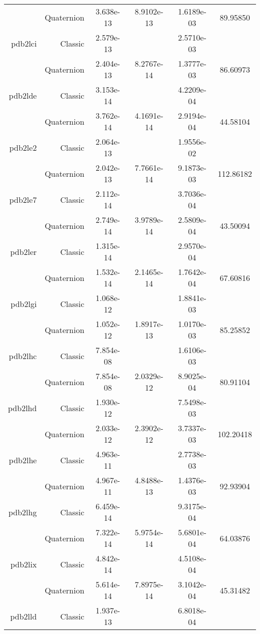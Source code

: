 \begin{xltabular}{\textwidth}{r|rS[table-format=1.3e+2]S[table-format=1.4e+2]S[table-format=1.4e+2]S[table-format=-1.5]}
& Quaternion & 3.638e-13 & 8.9102e-13 & 1.6189e-03 & 89.95850\\  \addlinespace
pdb2lci & Classic & 2.579e-13 &  & 2.5710e-03 & \\
& Quaternion & 2.404e-13 & 8.2767e-14 & 1.3777e-03 & 86.60973\\  \addlinespace
pdb2lde & Classic & 3.153e-14 &  & 4.2209e-04 & \\
& Quaternion & 3.762e-14 & 4.1691e-14 & 2.9194e-04 & 44.58104\\  \addlinespace
pdb2le2 & Classic & 2.064e-13 &  & 1.9556e-02 & \\
& Quaternion & 2.042e-13 & 7.7661e-14 & 9.1873e-03 & 112.86182\\  \addlinespace
pdb2le7 & Classic & 2.112e-14 &  & 3.7036e-04 & \\
& Quaternion & 2.749e-14 & 3.9789e-14 & 2.5809e-04 & 43.50094\\  \addlinespace
pdb2ler & Classic & 1.315e-14 &  & 2.9570e-04 & \\
& Quaternion & 1.532e-14 & 2.1465e-14 & 1.7642e-04 & 67.60816\\  \addlinespace
pdb2lgi & Classic & 1.068e-12 &  & 1.8841e-03 & \\
& Quaternion & 1.052e-12 & 1.8917e-13 & 1.0170e-03 & 85.25852\\  \addlinespace
pdb2lhc & Classic & 7.854e-08 &  & 1.6106e-03 & \\
& Quaternion & 7.854e-08 & 2.0329e-12 & 8.9025e-04 & 80.91104\\  \addlinespace
pdb2lhd & Classic & 1.930e-12 &  & 7.5498e-03 & \\
& Quaternion & 2.033e-12 & 2.3902e-12 & 3.7337e-03 & 102.20418\\  \addlinespace
pdb2lhe & Classic & 4.963e-11 &  & 2.7738e-03 & \\
& Quaternion & 4.967e-11 & 4.8488e-13 & 1.4376e-03 & 92.93904\\  \addlinespace
pdb2lhg & Classic & 6.459e-14 &  & 9.3175e-04 & \\
& Quaternion & 7.322e-14 & 5.9754e-14 & 5.6801e-04 & 64.03876\\  \addlinespace
pdb2lix & Classic & 4.842e-14 &  & 4.5108e-04 & \\
& Quaternion & 5.614e-14 & 7.8975e-14 & 3.1042e-04 & 45.31482\\  \addlinespace
pdb2lld & Classic & 1.937e-13 &  & 6.8018e-04 & \\

\end{xltabular}
